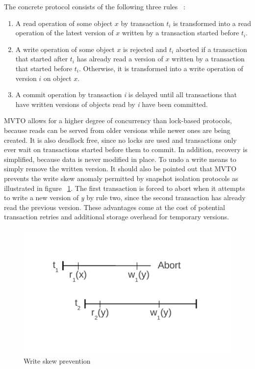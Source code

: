 \documentclass[10pt,final,journal]{IEEEtran}
\begin{document}
The concrete protocol consists of the following three rules ~\cite{Weikum:2001:TIS}:
\begin{enumerate}
\item A read operation of some object $x$ by transaction $t_i$ is transformed into a read operation of the latest version of $x$ written by a transaction started before $t_i$.
\item A write operation of some object $x$ is rejected and $t_i$ aborted if a transaction that started after $t_i$ has already read a version of $x$ written by a transaction that started before $t_i$. Otherwise, it is transformed into a write operation of version $i$ on object $x$.
\item A commit operation by transaction \emph{i} is delayed until all transactions that have written versions of objects read by \emph{i} have been committed.
\end{enumerate}

MVTO allows for a higher degree of concurrency than lock-based protocols, because reads can be served from older versions while newer ones are being created. It is also deadlock free, since no locks are used and transactions only ever wait on transactions started before them to commit. In addition, recovery is simplified, because data is never modified in place. To undo a write means to simply remove the written version. It should also be pointed out that MVTO prevents the write skew anomaly permitted by snapshot isolation protocols as illustrated in figure ~\ref{si}. The first transaction is forced to abort when it attempts to write a new version of \emph{y} by rule two, since the second transaction has already read the previous version. These advantages come at the cost of potential transaction retries and additional storage overhead for temporary versions.

\begin{figure}[!t]
\centering
\hspace*{-.2in}
\includegraphics{images/si.pdf}
\caption{Write skew prevention}
\label{si}
\end{figure}
\end{document}
